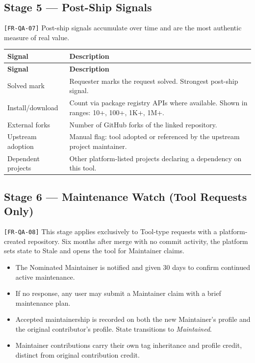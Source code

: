 \documentclass[12pt,a4paper]{article}
\begin{document}
\subsection{Stage 5 --- Post-Ship Signals}
\texttt{[FR-QA-07]} Post-ship signals accumulate over time and are the most authentic measure of real value.

\begin{longtable}{L{3.5cm} L{9.8cm}}
  \color{white}\bfseries Signal & \color{white}\bfseries Description \\
  \endfirsthead
  \color{white}\bfseries Signal & \color{white}\bfseries Description \\
  \endhead\hline
  Solved mark       & Requester marks the request solved. Strongest post-ship signal. \\
  Install/download  & Count via package registry APIs where available. Shown in ranges: 10+, 100+, 1K+, 1M+. \\
  External forks    & Number of GitHub forks of the linked repository. \\
  Upstream adoption & Manual flag: tool adopted or referenced by the upstream project maintainer. \\
  Dependent projects & Other platform-listed projects declaring a dependency on this tool. \\
  \hline
\end{longtable}

\subsection{Stage 6 --- Maintenance Watch (Tool Requests Only)}
\label{sec:stale}
\texttt{[FR-QA-08]} This stage applies exclusively to Tool-type requests with a platform-created repository. Six months after merge with no commit activity, the platform sets state to Stale and opens the tool for Maintainer claims.
\begin{itemize}
  \item The Nominated Maintainer is notified and given 30 days to confirm continued active maintenance.
  \item If no response, any user may submit a Maintainer claim with a brief maintenance plan.
  \item Accepted maintainership is recorded on both the new Maintainer's profile and the original contributor's profile. State transitions to \emph{Maintained}.
  \item Maintainer contributions carry their own tag inheritance and profile credit, distinct from original contribution credit.
\end{itemize}
\end{document}
